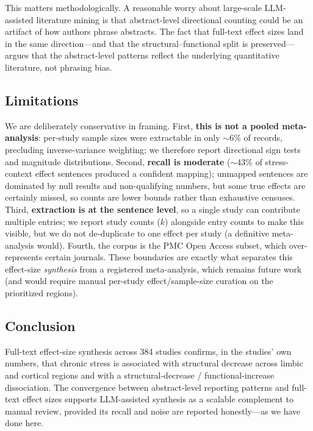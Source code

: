 \documentclass[11pt]{article}
\begin{document}
This matters methodologically. A reasonable worry about large-scale LLM-assisted
literature mining is that abstract-level directional counting could be an
artifact of how authors phrase abstracts. The fact that full-text effect sizes
land in the same direction---and that the structural--functional split is
preserved---argues that the abstract-level patterns reflect the underlying
quantitative literature, not phrasing bias.

\subsection{Limitations}
We are deliberately conservative in framing. First, \textbf{this is not a pooled
meta-analysis}: per-study sample sizes were extractable in only $\sim$6\% of
records, precluding inverse-variance weighting; we therefore report directional
sign tests and magnitude distributions. Second, \textbf{recall is moderate}
($\sim$43\% of stress-context effect sentences produced a confident mapping);
unmapped sentences are dominated by null results and non-qualifying numbers, but
some true effects are certainly missed, so counts are lower bounds rather than
exhaustive censuses. Third, \textbf{extraction is at the sentence level}, so a
single study can contribute multiple entries; we report study counts ($k$)
alongside entry counts to make this visible, but we do not de-duplicate to one
effect per study (a definitive meta-analysis would). Fourth, the corpus is the
PMC Open Access subset, which over-represents certain journals. These boundaries
are exactly what separates this effect-size \emph{synthesis} from a registered
meta-analysis, which remains future work (and would require manual per-study
effect/sample-size curation on the prioritized regions).

\subsection{Conclusion}
Full-text effect-size synthesis across 384 studies confirms, in the studies' own
numbers, that chronic stress is associated with structural decrease across
limbic and cortical regions and with a structural-decrease / functional-increase
dissociation. The convergence between abstract-level reporting patterns and
full-text effect sizes supports LLM-assisted synthesis as a scalable complement
to manual review, provided its recall and noise are reported honestly---as we
have done here.
\end{document}
